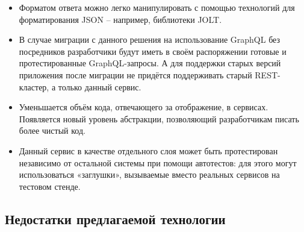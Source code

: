 \begin{itemize}
    \item Форматом ответа можно легко манипулировать с помощью технологий для форматирования JSON – например, библиотеки JOLT\cite{jolt-github}.
    \item В случае миграции с данного решения на использование GraphQL без посредников разработчики будут иметь в своём распоряжении готовые и протестированные GraphQL-запросы.
    А для поддержки старых версий приложения после миграции не придётся поддерживать старый REST-кластер, а только данный сервис.
    \item Уменьшается объём кода, отвечающего за отображение, в сервисах.
    Появляется новый уровень абстракции, позволяющий разработчикам писать более чистый код.
    \item Данный сервис в качестве отдельного слоя может быть протестирован независимо от остальной системы при помощи автотестов: для этого могут использоваться «заглушки», вызываемые вместо реальных сервисов на тестовом стенде.
\end{itemize}

\subsection{Недостатки предлагаемой технологии}\label{subsec:proposed-technology-disadvantages}

